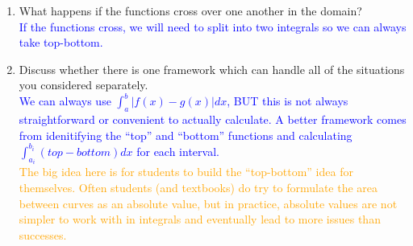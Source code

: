 \documentclass{ximera}
\begin{document}
\begin{exercise}
\begin{enumerate}
\begin{enumerate}
            \textcolor{blue}{If both functions are negative, then the integrals for both functions will be negative.  We want the positive area of the space between the two functions, so if we take integral of the function closer to the axis (negative and smaller) - integral of the function further from the axis (negative and larger) will result in the positive area between. }
            \item What happens if the functions cross over one another in the domain?\\
            \textcolor{blue}{If the functions cross, we will need to split into two integrals so we can always take top-bottom.}
            \item Discuss whether there is one framework which can handle all of the situations you considered separately.\\
            \textcolor{blue}{We can always use $\int_a^b |f(x)-g(x)|dx$, BUT this is not always straightforward or convenient to actually calculate.  A better framework comes from idenitifying the ``top'' and ``bottom'' functions and calculating $\int_{a_i}^{b_i} (top-bottom) dx$ for each interval.}\\
            \textcolor{orange}{The big idea here is for students to build the ``top-bottom'' idea for themselves.  Often students (and textbooks) do try to formulate the area between curves as an absolute value, but in practice, absolute values are not simpler to work with in integrals and eventually lead to more issues than successes. }
        \end{enumerate}
    \end{enumerate}

\end{exercise}
\end{document}
